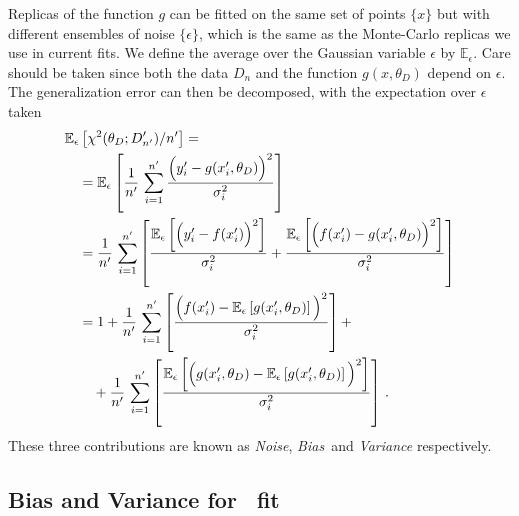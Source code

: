 Replicas of the function $g$ can be fitted on the same set of points $\{ x\}$
but with different ensembles of noise $\{ \epsilon\} $, which is the same as
the Monte-Carlo replicas we use in current fits. We define the average over the
Gaussian variable $\epsilon$ by $\mathbb{E}_\epsilon$. Care should be taken
since both the data $D_n$ and the function $g(x,\theta_D)$ depend on $\epsilon$.
The generalization error can then be decomposed, with the expectation over
$\epsilon$ taken
\begin{align}
    \label{eq:GenErr}
    &\mathbb{E}_{\epsilon}\left[\chi^2(\theta_D; D'_{n'})/n'\right] = \nonumber \\
    &\quad = \mathbb{E}_{\epsilon}\left[
        \frac{1}{n'}\, \sum_{i=1}^{n'}
        \frac{\Big(
            y'_i - g(x'_i,\theta_D)
        \Big)^2}{\sigma_i^2}
    \right] \\
    &\quad = \frac{1}{n'}\, \sum_{i=1}^{n'} \left[
        \frac{\mathbb{E}_\epsilon\left[
            \Big(y'_i - f(x'_i)\Big)^2
        \right]}{\sigma_i^2}
        + \frac{\mathbb{E}_{\epsilon}\left[\Big(f(x'_i)-g(x'_i,\theta_D)\Big)^2\right]}{\sigma_i^2}
    \right] \\
    &\quad = 1 + \frac{1}{n'}\, \sum_{i=1}^{n'} \left[
            \frac{\Big(f(x'_i) - \mathbb{E}_{\epsilon}\left[g(x'_i,\theta_D)\right]\Big)^2}{\sigma_i^2}
        \right] + \nonumber \\
    &\quad \quad +
        \frac{1}{n'}\, \sum_{i=1}^{n'} \left[
            \frac{
                \mathbb{E}_{\epsilon}\left[\Big(g(x'_i,\theta_D) -
                \mathbb{E}_{\epsilon}\left[g(x'_i,\theta_D)\right]\Big)^2\right]
            }{\sigma_i^2}
        \right]\, .
\end{align}
These three contributions are known as {\em Noise}, {\em Bias}\ and {\em Variance}
respectively.

\subsection{Bias and Variance for \nnpdf\ fit}

